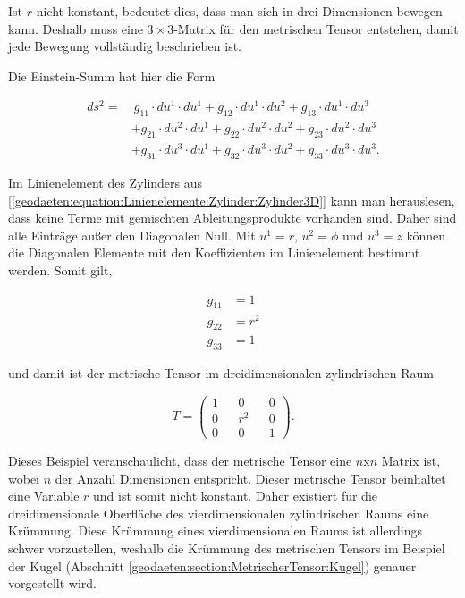Ist $r$ nicht konstant, bedeutet dies, dass man sich in drei Dimensionen bewegen kann.
Deshalb muss eine $3 \times 3$-Matrix für den metrischen Tensor entstehen, damit jede Bewegung vollständig beschrieben ist. 

Die Einstein-Summ hat hier die Form

\begin{equation}
\begin{aligned}
	ds^2 = &\ g_{11} \cdot du^1 \cdot du^1 + g_{12} \cdot du^1 \cdot du^2 + g_{13} \cdot du^1 \cdot du^3 \nonumber \\
	&+ g_{21} \cdot du^2 \cdot du^1 + g_{22} \cdot du^2 \cdot du^2 + g_{23} \cdot du^2 \cdot du^3 \nonumber \\
	&+ g_{31} \cdot du^3 \cdot du^1 + g_{32} \cdot du^3 \cdot du^2 + g_{33} \cdot du^3 \cdot du^3  .
\end{aligned} 
	\label{geodaeten:equation:MetrischerTensor:Kartesisch:EinsteinSumme3D}
\end{equation}

Im Linienelement des Zylinders aus [\ref{geodaeten:equation:Linienelemente:Zylinder:Zylinder3D}] kann man herauslesen, dass keine Terme mit gemischten Ableitungsprodukte vorhanden sind.
Daher sind alle Einträge außer den Diagonalen Null.
Mit $u^1 = r$, $u^2 = \phi$ und $u^3 = z$  können die Diagonalen Elemente mit den Koeffizienten im Linienelement bestimmt werden. 
Somit gilt,

\begin{equation}
	\begin{aligned}
		g_{11}  &= 1  \\
		g_{22}  &= r^2 \\
		g_{33}  &= 1  
	\end{aligned}
\end{equation}

und damit ist der metrische Tensor im dreidimensionalen zylindrischen Raum

\begin{equation}
	T = \begin{pmatrix} 1 && 0 && 0 \\ 0 && r^2 && 0 \\ 0 && 0 && 1 \end{pmatrix} .
\end{equation}

Dieses Beispiel veranschaulicht, dass der metrische Tensor eine $n$x$n$ Matrix ist, wobei $n$ der Anzahl Dimensionen entspricht.
Dieser metrische Tensor beinhaltet eine Variable $r$ und ist somit nicht konstant. 
Daher existiert für die dreidimensionale Oberfläche des vierdimensionalen zylindrischen Raums eine Krümmung.
Diese Krümmung eines vierdimensionalen Raums ist allerdings schwer vorzustellen, weshalb die Krümmung des metrischen Tensors im Beispiel der Kugel (Abschnitt \ref{geodaeten:section:MetrischerTensor:Kugel}) genauer vorgestellt wird.

